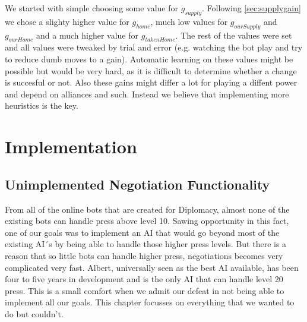 \documentclass[a4paper]{article} %
\begin{document}
We started with simple choosing some value for $g_{supply}$. Following \autoref{sec:supplygain} we chose a slighty higher value for $g_{home}$, much low values for $g_{ourSupply}$ and $g_{ourHome}$ and a much higher value for $g_{takenHome}$. The rest of the values were set and all values were tweaked by trial and error (e.g. watching the bot play and try to reduce dumb moves to a gain). Automatic learning on these values might be possible but would be very hard, as it is difficult to determine whether a change is succesful or not. Also these gains might differ a lot for playing a diffent power and depend on alliances and such. Instead we believe that implementing more heuristics is the key. 

\section{Implementation}

\subsection{Unimplemented Negotiation Functionality}

From all of the online bots that are created for Diplomacy, almost none of the existing bots can handle press above level 10. Sawing opportunity in this fact, one of our goals was to implement an AI that would go beyond most of the existing AI´s by being able to handle those higher press levels. But there is a reason that so little bots can handle higher press, negotiations becomes very complicated very fast. Albert, universally seen as the best AI available, has been four to five years in development and is the only AI that can handle level 20 press. This is a small comfort when we admit our defeat in not being able to implement all our goals. This chapter focusses on everything that we wanted to do but couldn't.
\end{document}
